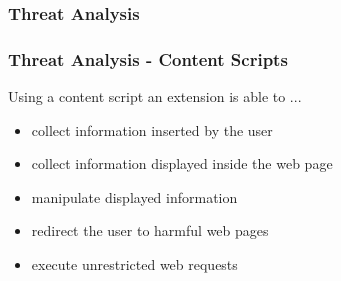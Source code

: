 \documentclass[accentcolor=tud9c,colorbacktitle,xcolor=dvipsnames]{tudbeamer}
\begin{document}
\begin{frame}
    \frametitle{Threat Analysis}
\end{frame}

\begin{frame}
    \frametitle{Threat Analysis - Content Scripts}
    \begin{block}{Using a content script an extension is able to ...}
        \begin{itemize}
            \item collect information inserted by the user
            \item collect information displayed inside the web page
            \item manipulate displayed information
            \item redirect the user to harmful web pages
            \item execute unrestricted web requests
        \end{itemize}
    \end{block}
\end{frame}
\end{document}
